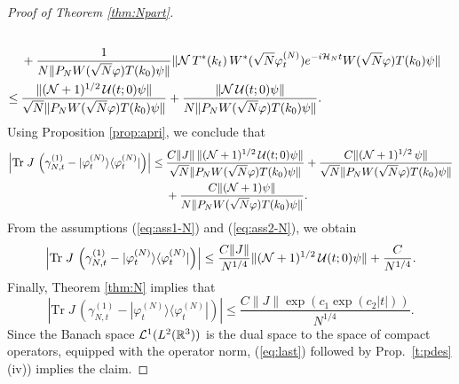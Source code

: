 \documentclass[11pt,a4paper]{article}
\newcommand{\cU}{{\cal U}}
\newcommand{\bR}{{\mathbb R}}
\newcommand{\tr}{\mbox{Tr}}
\newcommand{\cH}{{\cal H}}
\newcommand{\cL}{{\cal L}}
\newcommand{\cN}{{\cal N}}
\newcommand{\ph}{\varphi_t^{(N)}}	%
\begin{document}
\begin{proof}[Proof of Theorem \ref{thm:Npart}]
\[\begin{split}
\\ &+  \frac{1}{N \| P_N W(\sqrt{N} \varphi) T(k_0) \psi \|} \| \cN \, T^* (k_t) \, W^* (\sqrt{N} \varphi_t^{(N)})  e^{-i\cH_N t}  W(\sqrt{N} \varphi) T(k_0) \psi \|  \\ \leq \:& \frac{ \| (\cN+1)^{1/2} \, \cU (t;0) \psi \|}{\sqrt{N} \| P_N W(\sqrt{N} \varphi) T(k_0) \psi \|}  + \frac{ \| \cN \, \cU (t;0) \psi \| 
}{N \|  P_N W(\sqrt{N} \varphi) T(k_0) \psi \|}.  \end{split} \]
Using Proposition \ref{prop:apri}, we conclude that
\[  \begin{split}
\left| \tr \; J \, \left( \gamma^{(1)}_{N,t} - |\ph \rangle\langle \ph| \right)  \right|  \leq \:& \frac{C\| J \| \, \| (\cN+1)^{1/2} \, \cU (t;0) \psi \|}{\sqrt{N} \| P_N W(\sqrt{N} \varphi) T(k_0) \psi \|}   + 
\frac{C \| (\cN+1)^{1/2} \, \psi \|  }{\sqrt{N} \|  P_N W(\sqrt{N} \varphi) T(k_0) \psi \|}  
\\ &+ \frac{C \| (\cN+1) \psi \| }{N \| P_N W(\sqrt{N} \varphi) T(k_0) \psi \|}.  \end{split}
\]
{F}rom the assumptions (\ref{eq:ass1-N}) and (\ref{eq:ass2-N}), we obtain
\[ \left| \tr \; J \, \left( \gamma^{(1)}_{N,t} - |\ph \rangle\langle \ph| \right)  \right| \leq \frac{C\| J \|}{N^{1/4}} \| (\cN+1)^{1/2} \, \cU (t;0) \psi \| + \frac{C}{N^{1/4}}. \]
Finally, Theorem \ref{thm:N} implies that
\begin{equation}\label{eq:last} \left| \tr \; J \, \left( \gamma^{(1)}_{N,t} - |\ph \rangle\langle \ph| \right)  \right| \leq \frac{C\| J \| \exp \left(c_1 \exp (c_2 |t|) \right)}{N^{1/4}}. \end{equation}
Since the Banach space $\cL^1 (L^2 (\bR^3))$ is the dual space to the space of compact operators, equipped with the operator norm, (\ref{eq:last}) followed by Prop.~\ref{t:pdes}(iv)) implies the claim. 
\end{proof}
\end{document}

